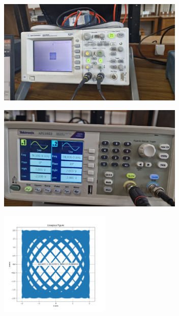 \documentclass[a4paper,12pt]{article}
\begin{document}
\begin{figure}[H]

    \centering
    \begin{subfigure}{\textwidth}
        \centering
        \includegraphics[height=5cm]{figures/6/plot.jpg}
    \end{subfigure}%
    \begin{subfigure}{\textwidth}
        \centering
        \includegraphics[height=5cm]{figures/6/para.jpg}
    \end{subfigure}
    \begin{subfigure}{\textwidth}
        \centering
        \includegraphics[height=5cm]{figures/6/Figure_6.png}
    \end{subfigure}%
\end{figure}
\end{document}
